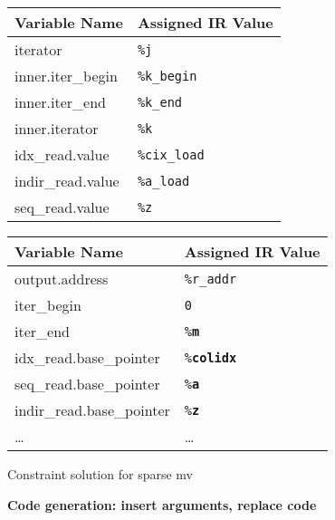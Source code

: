 {\centering
\footnotesize 
\begin{tabular}{l|l}
\textbf{Variable Name} & \textbf{Assigned IR Value}\\
\hline
iterator                    & \texttt{\%j}\\
inner.iter\_begin           & \texttt{\%k\_begin}\\
inner.iter\_end             & \texttt{\%k\_end}\\
inner.iterator              & \texttt{\%k}\\
idx\_read.value             & \texttt{\%cix\_load}\\
indir\_read.value           & \texttt{\%a\_load}\\
seq\_read.value             & \texttt{\%z}\\
\end{tabular}
\hspace{0.5cm}
\begin{tabular}{l|l}
\textbf{Variable Name} & \textbf{Assigned IR Value}\\
\hline
output.address              & \texttt{\%r\_addr}\\
iter\_begin                 & \texttt{0}\\
iter\_end                   & \texttt{\%\bf m}\\
idx\_read.base\_pointer     & \texttt{\%\bf colidx}\\
seq\_read.base\_pointer     & \texttt{\%\bf a}\\
indir\_read.base\_pointer   & \texttt{\%\bf z}\\
\dots                       & \dots\vspace{-0.5mm}\\
\end{tabular}

}

\caption{Constraint solution for sparse mv}
\label{fig:spmvexample2}

\centering
\vspace{0.0em}
{\centering
\begin{minipage}{0.05\linewidth}
\vspace{0pt}
\centering
{}
\end{minipage}
\begin{minipage}{\linewidth}
\centering
\textbf{Code generation: insert arguments, replace code}
\end{minipage}
\begin{minipage}{0.05\linewidth}
\vspace{0pt}
\centering
{}
\end{minipage}
}


